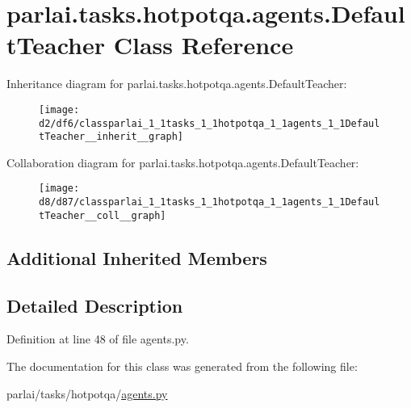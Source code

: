 \hypertarget{classparlai_1_1tasks_1_1hotpotqa_1_1agents_1_1DefaultTeacher}{}\section{parlai.\+tasks.\+hotpotqa.\+agents.\+Default\+Teacher Class Reference}
\label{classparlai_1_1tasks_1_1hotpotqa_1_1agents_1_1DefaultTeacher}


Inheritance diagram for parlai.\+tasks.\+hotpotqa.\+agents.\+Default\+Teacher\+:
\nopagebreak
\begin{figure}[H]
\begin{center}
\leavevmode
\texttt{[image: d2/df6/classparlai\_1\_1tasks\_1\_1hotpotqa\_1\_1agents\_1\_1DefaultTeacher\_\_inherit\_\_graph]}
\end{center}
\end{figure}


Collaboration diagram for parlai.\+tasks.\+hotpotqa.\+agents.\+Default\+Teacher\+:
\nopagebreak
\begin{figure}[H]
\begin{center}
\leavevmode
\texttt{[image: d8/d87/classparlai\_1\_1tasks\_1\_1hotpotqa\_1\_1agents\_1\_1DefaultTeacher\_\_coll\_\_graph]}
\end{center}
\end{figure}
\subsection*{Additional Inherited Members}


\subsection{Detailed Description}


Definition at line 48 of file agents.\+py.



The documentation for this class was generated from the following file\+:\begin{DoxyCompactItemize}
\item 
parlai/tasks/hotpotqa/\hyperlink{parlai_2tasks_2hotpotqa_2agents_8py}{agents.\+py}\end{DoxyCompactItemize}
